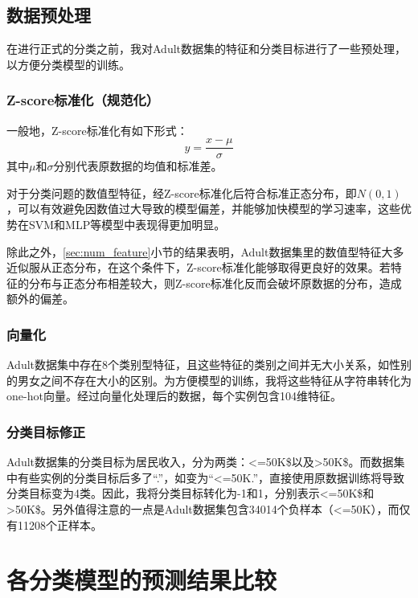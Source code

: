 \documentclass[12pt,a4paper]{article}
\theoremstyle{definition}
\begin{document}
\subsection{数据预处理}

在进行正式的分类之前，我对Adult数据集的特征和分类目标进行了一些预处理，以方便分类模型的训练。

\subsubsection{Z-score标准化（规范化）}

一般地，Z-score标准化有如下形式：
\begin{equation}
	y = \dfrac{x - \mu}{\sigma}
\end{equation}
其中$\mu$和$\sigma$分别代表原数据的均值和标准差。

\vspace{0.01\linewidth}
对于分类问题的数值型特征，经Z-score标准化后符合标准正态分布，即$N(0, 1)$，可以有效避免因数值过大导致的模型偏差，并能够加快模型的学习速率，这些优势在SVM和MLP等模型中表现得更加明显。

\vspace{0.01\linewidth}
除此之外，\ref{sec:num_feature}小节的结果表明，Adult数据集里的数值型特征大多近似服从正态分布，在这个条件下，Z-score标准化能够取得更良好的效果。若特征的分布与正态分布相差较大，则Z-score标准化反而会破坏原数据的分布，造成额外的偏差。

\subsubsection{向量化}

Adult数据集中存在8个类别型特征，且这些特征的类别之间并无大小关系，如性别的男女之间不存在大小的区别。为方便模型的训练，我将这些特征从字符串转化为one-hot向量。经过向量化处理后的数据，每个实例包含104维特征。

\subsubsection{分类目标修正}
\label{sec:fix-target}

Adult数据集的分类目标为居民收入，分为两类：<=50K\$以及>50K\$。而数据集中有些实例的分类目标后多了“.”，如变为“<=50K.”，直接使用原数据训练将导致分类目标变为4类。因此，我将分类目标转化为-1和1，分别表示<=50K\$和>50K\$。另外值得注意的一点是Adult数据集包含34014个负样本（<=50K），而仅有11208个正样本。

\section{各分类模型的预测结果比较}
\end{document}
